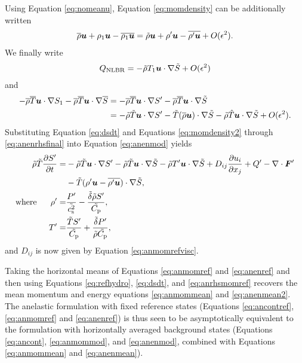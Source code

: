 \documentclass[12pt]{article}
\newcommand{\vecf}{\bm{F}}
\begin{document}
Using Equation \eqref{eq:nomeanu}, Equation \eqref{eq:momdensity} can be additionally written
  \begin{align}\label{eq:momdensity2}
\overline{\rho}\bm{u} + \rho_1\bm{u} - \overline{\rho_1\bm{u}} = \tilde{\rho}\bm{u} + \rho^\prime\bm{u} - \overline{\rho^\prime\bm{u}} + O(\epsilon^2).
\end{align}
We finally write 
\begin{align}
	Q_{\rm NLBR} = -\tilde{\rho} T_1\bm{u}\cdot\nabla\tilde{S} + O(\epsilon^2)
\end{align}
and 
\begin{align}\label{eq:anenrhsfinal}
	-\overline{\rho}\overline{T} \bm{u}\cdot\nabla S_1 - \overline{\rho}\overline{T} \bm{u}\cdot\nabla\overline{S} &= - \overline{\rho}\overline{T}\bm{u}\cdot\nabla S^\prime -\overline{\rho}\overline{T}\bm{u}\cdot\nabla\tilde{S} \nonumber\\
	&=-\tilde{\rho}\tilde{T}\bm{u}\cdot\nabla S^\prime - \tilde{T}(\overline{\rho} \bm{u})\cdot\nabla\tilde{S} - \tilde{\rho}\hat{T}\bm{u}\cdot\nabla\tilde{S} + O(\epsilon^2).
\end{align}
Substituting Equation \eqref{eq:dsdt} and Equations \eqref{eq:momdensity2} through \eqref{eq:anenrhsfinal} into Equation \eqref{eq:anenmod} yields
\begin{subequations}\label{eq:anenref}
	\begin{align}
		\rhotilde\tilde{T}\pderiv{\entrprime}{t}= &-\rhotilde\tilde{T}\ugrad \entrprime - \rhotilde\tilde{T} \ugrad \tilde{S} - \rhotilde \tmpprime\ugrad\tilde{S}+D_{ij}\pderiv{u_i}{x_j} + Q^\prime- \Div\vecf^\prime  \nonumber\\
		& - \tilde{T}(\rhoprime \vecu-\overline{\rhoprime\vecu})\cdot\nabla\tilde{S},\label{eq:anenrefmain}\\
		\where \rhoprime =& \frac{\prsprime}{\tilde{\cs^2}}-\frac{\tilde{\delta}\rhotilde S ^\prime}{\tilde{\cpcap}},\\
		 \tmpprime = & \frac{\tilde{T} \entrprime}{\tilde{\cpcap}} + \frac{\tilde{\delta} \prsprime}{\rhotilde\tilde{\cpcap}},
	\end{align}
\end{subequations}
and $D_{ij}$ is now given by Equation \eqref{eq:anmomrefvisc}. 

Taking the horizontal means of Equations \eqref{eq:anmomref} and \eqref{eq:anenref} and then using Equations \eqref{eq:refhydro}, \eqref{eq:dsdt}, and \eqref{eq:anrhsmomref} recovers the mean momentum and energy equations \eqref{eq:anmommean} and \eqref{eq:anenmean2}. The anelastic formulation with fixed reference states (Equations \eqref{eq:ancontref}, \eqref{eq:anmomref} and \eqref{eq:anenref}) is thus seen to be asymptotically equivalent to the formulation with horizontally averaged background states (Equations \eqref{eq:ancont}, \eqref{eq:anmommod}, and \eqref{eq:anenmod}, combined with Equations \eqref{eq:anmommean} and \eqref{eq:anenmean}). 
\end{document}
